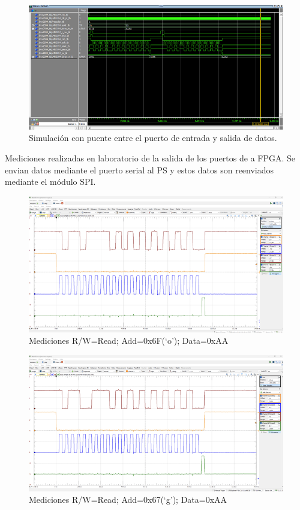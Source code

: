 \documentclass[
11pt, %
]{charter}
\begin{document}
\begin{figure}[htpb]
\centering 
\includegraphics[width=.95\textwidth]{./Figuras/SimulaciónModelSim.png}
\caption{Simulación con puente entre el puerto de entrada y salida de datos.}
\label{fig:diagBloques}
\end{figure}

\vspace{25px}

Mediciones realizadas en laboratorio de la salida de los puertos de a FPGA. Se envian datos mediante el puerto serial al PS y estos datos son reenviados mediante el módulo SPI.


\begin{figure}[htpb]
\centering 
\includegraphics[width=.95\textwidth]{./Figuras/SeñalesTx1.png}
\caption{Mediciones R/W=Read; Add=0x6F(‘o’); Data=0xAA}
\label{fig:diagBloques}
\end{figure}

\vspace{25px}

\begin{figure}[htpb]
\centering 
\includegraphics[width=.95\textwidth]{./Figuras/SeñalesTx67.png}
\caption{Mediciones R/W=Read; Add=0x67(‘g’); Data=0xAA}
\label{fig:diagBloques}
\end{figure}
\end{document}
